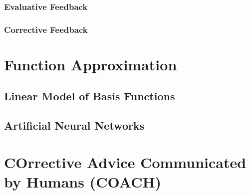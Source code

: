\subsubsection{Evaluative Feedback}
\subsubsection{Corrective Feedback}
\section{Function Approximation}
\subsection{Linear Model of Basis Functions}
\subsection{Artificial Neural Networks}
\section{COrrective Advice Communicated by Humans (COACH)}